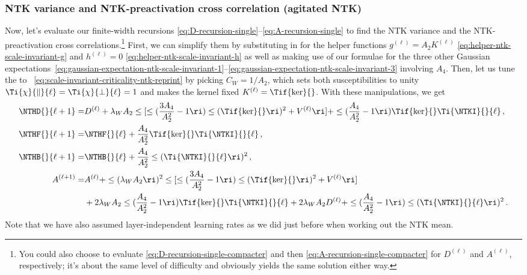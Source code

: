 \subsubsection{NTK variance and NTK-preactivation cross correlation (agitated NTK)}

Now, let's evaluate our finite-width recursions \eqref{eq:D-recursion-single}--\eqref{eq:A-recursion-single} to find the NTK variance and the NTK-preactivation cross correlations.\footnote{
    You could also choose to evaluate \eqref{eq:D-recursion-single-compacter} and then \eqref{eq:A-recursion-single-compacter} for $D^{(\ell)}$ and $A^{(\ell)}$, respectively; it's about the same level of difficulty and obviously yields the same solution either way.
} First, we can simplify them by substituting in for the helper functions $g^{(\ell)}=A_2 K^{(\ell)}$ \eqref{eq:helper-ntk-scale-invariant-g} and $h^{(\ell)}=0$ \eqref{eq:helper-ntk-scale-invariant-h} as well as making use of our formulae for the three other Gaussian expectations~\eqref{eq:gaussian-expectation-ntk-scale-invariant-1}--\eqref{eq:gaussian-expectation-ntk-scale-invariant-3} involving $A_4$. Then, let us tune the  to ~\eqref{eq:scale-invariant-criticality-ntk-reprint} by picking $C_W=1/A_2$, which sets both susceptibilities to unity $\Ti{\chi}{\parallel}{\ell}=\Ti{\chi}{\perp}{\ell}=1$ and makes the kernel fixed $K^{(\ell)}=\Tif{\ker}{}$. With these manipulations, we get
\begin{align}
\NTHD{}{\ell+1}=&D^{(\ell)}+\lambda_W A_2  \le[\le(\frac{3A_4}{A_2^2}-1\ri)\le(\Tif{\ker}{}\ri)^2+V^{(\ell)}\ri]+\le(\frac{A_4}{A_2^2}-1\ri)\Tif{\ker}{}\Ti{\NTKI}{}{\ell}\, ,\\
\NTHF{}{\ell+1}=&\NTHF{}{\ell}+\frac{A_4}{A_2^2}\Tif{\ker}{}\Ti{\NTKI}{}{\ell}\, ,\\
\NTHB{}{\ell+1}=& \NTHB{}{\ell}+\frac{A_4}{A_2^2}\le(\Ti{\NTKI}{}{\ell}\ri)^2 \, ,\\
A^{(\ell+1)}=& A^{(\ell)}+\le(\lambda_W A_2\ri)^2 \le[\le(\frac{3A_4}{A_2^2}-1\ri)\le(\Tif{\ker}{}\ri)^2+V^{(\ell)}\ri]\, \\
&+2\lambda_W A_2\le(\frac{A_4}{A_2^2}-1\ri)\Tif{\ker}{}\Ti{\NTKI}{}{\ell}+2\lambda_W A_2 D^{(\ell)}+\le(\frac{A_4}{A_2^2}-1\ri)\le(\Ti{\NTKI}{}{\ell}\ri)^2  \, .\nonumber
\end{align}
Note that we have also assumed layer-independent learning rates as we did just before when working out the NTK mean.

